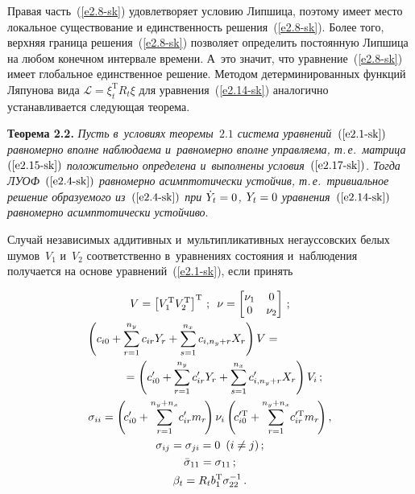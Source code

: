 \begin{multicols}{2}
Правая часть~(\ref{e2.8-sk}) удовлетворяет условию Липшица, поэтому имеет
место локальное существование и единственность решения~(\ref{e2.8-sk}). Более
того, верхняя граница решения~(\ref{e2.8-sk}) позволяет определить постоянную
Липшица на любом конечном интервале времени. А~это значит, что
уравнение~(\ref{e2.8-sk}) имеет глобальное единственное решение. Методом
детерминированных функций Ляпунова вида $\mathcal{L}= \xi_t^{\mathrm{T}} R_t \xi$
для уравнения~(\ref{e2.14-sk}) аналогично~\cite{6-sk, 7-sk}
устанавливается следующая теорема.

\smallskip

\noindent
\textbf{Теорема 2.2.} \textit{Пусть в~условиях теоремы~$2.1$
система уравнений~$(\ref{e2.1-sk})$
равномерно вполне наблюдаема и~равномерно вполне управляема,
т.\,е.\ матрица~$(\ref{e2.15-sk})$ положительно определена
и~выполнены условия~$(\ref{e2.17-sk})$. Тогда ЛУОФ~$(\ref{e2.4-sk})$
равномерно асимптотически  устойчив, т.\,е.\
тривиальное решение  образуемого из~$(\ref{e2.4-sk})$ при
$\dot Y_t \hm=0$, $Y_t\hm=0$  уравнения~$(\ref{e2.14-sk})$
равномерно асимптотически устойчиво}.

\smallskip

Случай независимых аддитивных и~мультипликативных негауссовских белых шумов~$V_1$
и~$V_2$ соответственно в~уравнениях состояния и~наблюдения получается на
основе уравнений~(\ref{e2.1-sk}), если принять

\noindent
\begin{gather}
V= \lk V_1^{\mathrm{T}} V_2^{\mathrm{T}}\rk^{\mathrm{T}}\,;\enskip \nu = \begin{bmatrix}
    \nu_1&0\\
    0&\nu_2
    \end{bmatrix}\,;\label{e2.18-sk}\\
\hspace*{-16mm}\left( c_{i0} +\sss_{r=1}^{n_y} c_{ir} Y_r +\sss_{s=1}^{n_x}
c_{i, n_y+r} X_r\right) V= {}\notag\\
\hspace{8mm}{}=\left( c_{i0}' +\sss_{r=1}^{n_y} c_{ir}' Y_r +\sss_{s=1}^{n_x}
c_{i, n_y+r}' X_r\right) V_i\,;\label{e2.19-sk}\\
\sigma_{ii} =\left(\! c_{i0}' +\sss_{r=1}^{n_y+n_x}\! c_{ir}' m_r \!\right)
\nu_i \left(\! c_{i0}^{\prime \mathrm{T}} +\sss_{r=1}^{n_y+n_x}\! c_{ir}^{\prime \mathrm{T}} m_r \!\right),\notag\\
\sigma_{ij} =\sigma_{ji}=0\enskip (i\ne j)\,;\notag %
\\
\bar \sigma_{11} =\sigma_{11}\,;\label{e2.21-sk}\\
\beta_t = R_t b_1^{\mathrm{T}} \sigma_{22}^{-1}\,.\label{e2.22-sk}
\end{gather}


\end{multicols}
